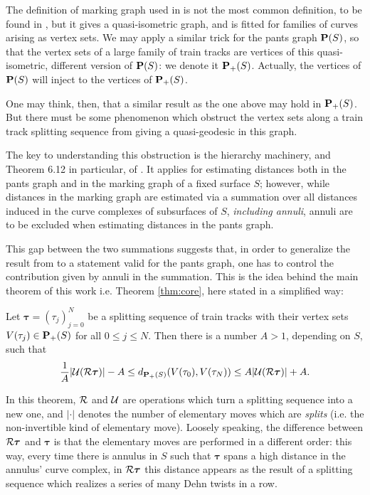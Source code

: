 The definition of marking graph used in \cite{mms} is not the most common definition, to be found in \cite{masurminskyii}, but it gives a quasi-isometric graph, and is fitted for families of curves arising as vertex sets. We may apply a similar trick for the pants graph $\mathbf P(S)$, so that the vertex sets of a large family of train tracks are vertices of this quasi-isometric, different version of $\mathbf P(S)$: we denote it ${\mathbf{P}_+}(S)$. Actually, the vertices of $\mathbf P(S)$ will inject to the vertices of ${\mathbf{P}_+}(S)$.

One may think, then, that a similar result as the one above may hold in ${\mathbf{P}_+}(S)$. But there must be some phenomenon which obstruct the vertex sets along a train track splitting sequence from giving a quasi-geodesic in this graph.

The key to understanding this obstruction is the hierarchy machinery, and Theorem 6.12 in particular, of \cite{masurminskyii}. It applies for estimating distances both in the pants graph and in the marking graph of a fixed surface $S$; however, while distances in the marking graph are estimated via a summation over all distances induced in the curve complexes of subsurfaces of $S$, \emph{including annuli}, annuli are to be excluded when estimating distances in the pants graph. 

This gap between the two summations suggests that, in order to generalize the result from \cite{mms} to a statement valid for the pants graph, one has to control the contribution given by annuli in the summation. This is the idea behind the main theorem of this work i.e. Theorem \ref{thm:core}, here stated in a simplified way:

\begin{theono}
Let $\bm\tau=(\tau_j)_{j=0}^N$ be a splitting sequence of train tracks with their vertex sets $V(\tau_j)\in{\mathbf{P}_+}(S)$ for all $0\leq j\leq N$. Then there is a number $A>1$, depending on $S$, such that
$$\frac{1}{A}|{\mathcal U}({\mathcal R}\bm\tau)|-A\leq d_{{\mathbf{P}_+}(S)}(V(\tau_0),V(\tau_N))\leq A|{\mathcal U}({\mathcal R}\bm\tau)|+A.$$
\end{theono}

In this theorem, ${\mathcal R}$ and ${\mathcal U}$ are operations which turn a splitting sequence into a new one, and $|\cdot|$ denotes the number of elementary moves which are \emph{splits} (i.e. the non-invertible kind of elementary move). Loosely speaking, the difference between ${\mathcal R}\bm\tau$ and $\bm\tau$ is that the elementary moves are performed in a different order: this way, every time there is annulus in $S$ such that $\bm\tau$ spans a high distance in the annulus' curve complex, in ${\mathcal R}\bm\tau$ this distance appears as the result of a splitting sequence which realizes a series of many Dehn twists in a row.

